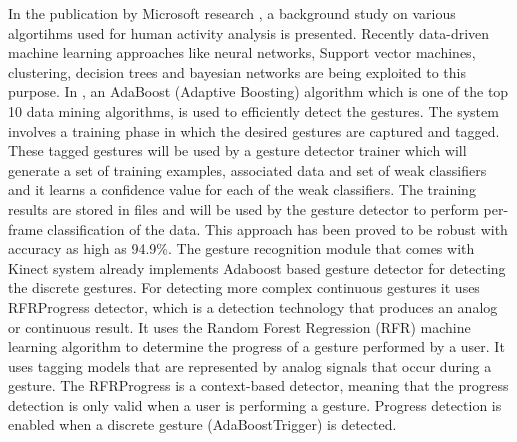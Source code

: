 In the publication by Microsoft research \cite{han2013enhanced}, a background study on various algortihms used for human activity analysis is presented. Recently \cite{KinectSDK2014} data-driven machine learning approaches like neural networks, Support vector machines, clustering, decision trees and bayesian networks are being exploited to this purpose. In \cite{KinectSDK2014}, an AdaBoost (Adaptive Boosting) algorithm \cite{freund1997decision} which is one of the top 10 data mining algorithms, is used to efficiently detect the gestures. The system involves a training phase in which the desired gestures are captured and tagged. These tagged gestures will be used by a gesture detector trainer which will generate a set of training examples, associated data and set of weak classifiers and it learns a confidence value for each of the weak classifiers. The training results are stored in files and will be used by the gesture detector to perform per-frame classification of the data. This approach has been proved to be robust with accuracy as high as 94.9\%. The gesture recognition module that comes with Kinect system already implements Adaboost based gesture detector for detecting the discrete gestures. For detecting more complex continuous gestures it uses RFRProgress detector, which is a detection technology that produces an analog or continuous result. It uses the Random Forest Regression (RFR) machine learning algorithm to determine the progress of a gesture performed by a user. It uses tagging models that are represented by analog signals that occur during a gesture. The RFRProgress is a context-based detector, meaning that the progress detection is only valid when a user is performing a gesture. Progress detection is enabled when a discrete gesture (AdaBoostTrigger) is detected.


